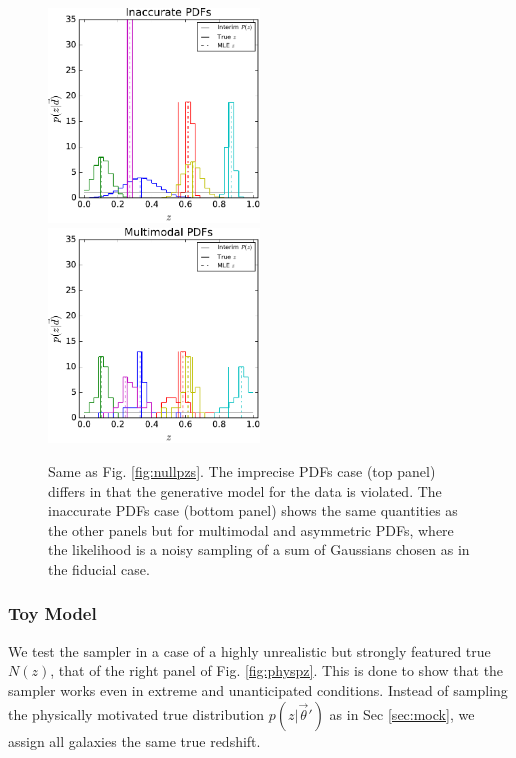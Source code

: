 \documentclass[preprint]{aastex}
\begin{document}
\begin{figure}
\includegraphics[width=0.5\textwidth]{figs/vars/samplepzs.pdf}\\
\includegraphics[width=0.5\textwidth]{figs/mult/samplepzs.pdf}
\caption{Same as Fig. \ref{fig:nullpzs}.  The imprecise PDFs case (top panel) 
differs in that the generative model for the data is violated.  The inaccurate 
PDFs case (bottom panel) shows the same quantities as the other panels but for 
multimodal and asymmetric PDFs, where the likelihood is a noisy sampling of a 
sum of Gaussians chosen as in the fiducial case.}
\label{fig:allpzs}
\end{figure}

\subsubsection{Toy Model}
\label{sec:fake-data}

We test the sampler in a case of a highly unrealistic but strongly featured 
true $N(z)$, that of the right panel of Fig. \ref{fig:physpz}.  This is done to 
show that the sampler works even in extreme and unanticipated conditions.  
Instead of sampling the physically motivated true distribution 
$p(z|\vec{\theta}')$ as in Sec \ref{sec:mock}, we assign all galaxies the same 
true redshift.  
\end{document}
